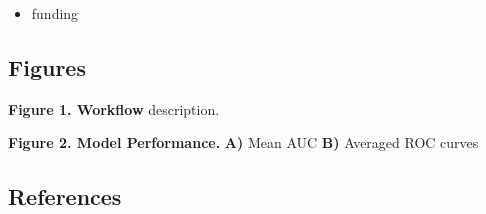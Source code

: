 \documentclass[
  11pt,
]{article}
\providecommand{\tightlist}{%
  \setlength{\itemsep}{0pt}\setlength{\parskip}{0pt}}
\begin{document}
\begin{itemize}
\tightlist
\item
  funding
\end{itemize}

\newpage

\hypertarget{figures}{%
\subsection{Figures}\label{figures}}

\textbf{Figure 1. Workflow} description.

\textbf{Figure 2. Model Performance.} \textbf{A)} Mean AUC \textbf{B)}
Averaged ROC curves

\newpage

\hypertarget{references}{%
\subsection{References}\label{references}}
\end{document}

